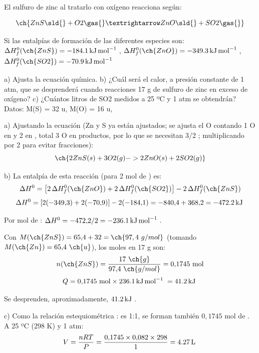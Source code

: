 \begin{exercise}
    El sulfuro de zinc al tratarlo con oxígeno reacciona según:

    \begin{equation*}
        \ch{ZnS \sld{} + O2 \gas{} → ZnO \sld{} + SO2 \gas{}}
    \end{equation*}

    Si las entalpías de formación de las diferentes especies son:  \(\Delta H^0_f (\ch{ZnS}) = \energia[kjmol]{-184.1}\), \(\Delta H^0_f (\ch{ZnO}) = \energia[kjmol]{-349.3}\), \(\Delta H^0_f (\ch{SO2}) = \energia[kjmol]{-70.9}\)

    a) Ajusta la ecuación química.
    b) ¿Cuál será el calor, a presión constante de 1 atm, que se desprenderá cuando reacciones
    17 g de sulfuro de zinc en exceso de oxígeno?
    c) ¿Cuántos litros de SO2 medidos a 25 ºC y 1 atm se obtendrán?
    Datos: M(S) = 32 u, M(O) = 16 u,  \ctegases{}

    \begin{solu}


        a) Ajustando la ecuación (Zn y S ya están ajustados; se ajusta el O contando 1 O en  y 2 en , total 3 O en productos, por lo que se necesitan 3/2 ; multiplicando por 2 para evitar fracciones):
        \[
            \ch{2 ZnS (s) + 3 O2 (g) -> 2 ZnO (s) + 2 SO2 (g)}
        \]

        b) La entalpía de esta reacción (para 2 mol de ) es:
        \[
            \Delta H^0 = \left[2\,\Delta H^0_f(\ch{ZnO}) + 2\,\Delta H^0_f(\ch{SO2})\right] - 2\,\Delta H^0_f(\ch{ZnS})
        \]
        \[
            \Delta H^0 = \left[2(-349{,}3)+2(-70{,}9)\right] - 2(-184{,}1) = -840{,}4+368{,}2 = \energia[kj]{-472,2}
        \]

        Por mol de : \(\Delta H^0 = -472{,}2/2 = \energia[kjmol]{-236,1}\).

        Con \(M(\ch{ZnS}) = 65{,}4+32 = \ch{97,4\ g/mol}\) (tomando \(M(\ch{Zn}) = 65{,}4\ \ch{u}\)), los moles en 17 g son:
        \[
            n(\ch{ZnS}) = \frac{17\ \ch{g}}{97{,}4\ \ch{g/mol}} = 0{,}1745\ \text{mol}
        \]
        \[
            Q = 0{,}1745\ \text{mol} \times \energia[kjmol]{236,1} = \energia[kj]{41,2}
        \]

        Se desprenden, aproximadamente, \(\energia[kj]{41,2}\).

        c) Como la relación estequiométrica : es 1:1, se forman también \(0{,}1745\) mol de . A 25 ºC (298 K) y 1 atm:
        \[
            V = \frac{nRT}{P} = \frac{0{,}1745 \times 0{,}082 \times 298}{1} = \volumen[l]{4,27}
        \]
    \end{solu}
\end{exercise}

